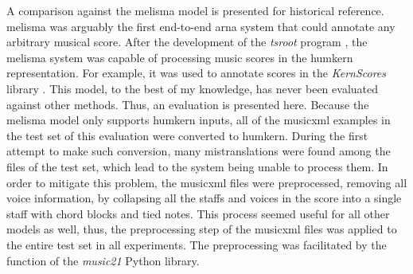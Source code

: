 
A comparison against the \gls{melisma} model is presented
for historical reference. \gls{melisma} was arguably the
first end-to-end \gls{arna} system that could annotate any
arbitrary musical score. After the development of the
\emph{tsroot} program \parencite{sapp2009tsroot}, the
\gls{melisma} system was capable of processing music scores
in the \gls{humkern} representation. For example, it was
used to annotate scores in the \emph{KernScores} library
\parencite{sapp2005online}. This model, to the best of my
knowledge, has never been evaluated against other methods.
Thus, an evaluation is presented here. Because the
\gls{melisma} model only supports \gls{humkern} inputs, all
of the \gls{musicxml} examples in the test set of this
evaluation were converted to \gls{humkern}. During the first
attempt to make such conversion, many mistranslations were
found among the files of the test set, which lead to the
system being unable to process them. In order to mitigate
this problem, the \gls{musicxml} files were preprocessed,
removing all voice information, by collapsing all the staffs
and voices in the score into a single staff with chord
blocks and tied notes. This process seemed useful for all
other models as well, thus, the preprocessing step of the
\gls{musicxml} files was applied to the entire test set in
all experiments. The preprocessing was facilitated by the
 function of the \emph{music21} Python
library.




    

